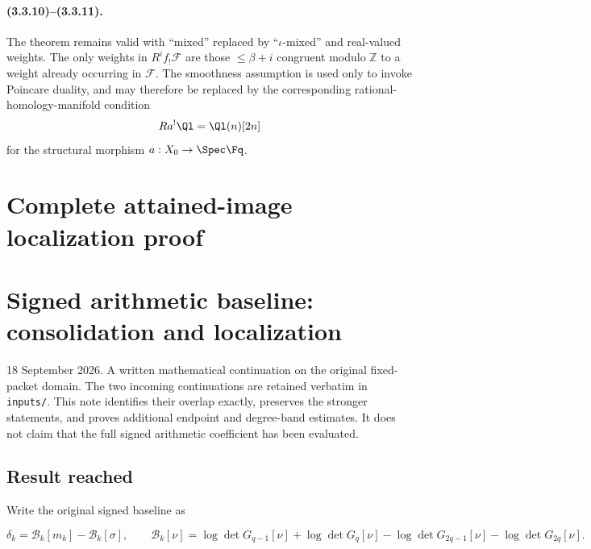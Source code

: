 \documentclass[11pt,a4paper]{article}
\begin{document}
\paragraph{(3.3.10)--(3.3.11).}
The theorem remains valid with ``mixed'' replaced by ``$\iota$-mixed'' and real-valued weights. The only weights in $R^if_{!}\mathcal F$ are those $\le\beta+i$ congruent modulo $\mathbb Z$ to a weight already occurring in $\mathcal F$. The smoothness assumption is used only to invoke Poincare duality, and may therefore be replaced by the corresponding rational-homology-manifold condition
\[
Ra^!\Ql=\Ql(n)[2n]
\]
for the structural morphism $a:X_0\to\Spec\Fq$.


\endgroup

\clearpage
\begingroup


\setcounter{equation}{0}
\renewcommand{\theequation}{LOC.\arabic{equation}}
\section*{Complete attained-image localization proof}
\section{Signed arithmetic baseline: consolidation and localization}\label{loc:signed-arithmetic-baseline-consolidation-and-localization}

18 September 2026. A written mathematical continuation on the original fixed-packet domain. The two incoming continuations are retained verbatim in \texttt{inputs/}. This note identifies their overlap exactly, preserves the stronger statements, and proves additional endpoint and degree-band estimates. It does not claim that the full signed arithmetic coefficient has been evaluated.

\subsection{Result reached}\label{loc:result-reached}

Write the original signed baseline as

\[
\delta_k=\mathcal B_k[m_k]-\mathcal B_k[\sigma],\qquad
\mathcal B_k[\nu]=\log\det G_{q-1}[\nu]+\log\det G_q[\nu]
-\log\det G_{2q-1}[\nu]-\log\det G_{2q}[\nu].
\]
\end{document}
